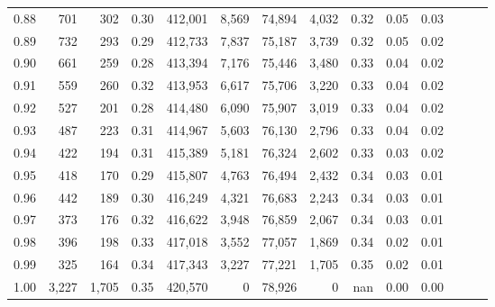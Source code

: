 \begin{tabular}{rrrrrrrrrrrrrr}
0.88 &     701 &    302 &  0.30 &  412,001 &    8,569 &  74,894 &   4,032 &  0.32 &  0.05 &      0.03 \\
0.89 &     732 &    293 &  0.29 &  412,733 &    7,837 &  75,187 &   3,739 &  0.32 &  0.05 &      0.02 \\
0.90 &     661 &    259 &  0.28 &  413,394 &    7,176 &  75,446 &   3,480 &  0.33 &  0.04 &      0.02 \\
0.91 &     559 &    260 &  0.32 &  413,953 &    6,617 &  75,706 &   3,220 &  0.33 &  0.04 &      0.02 \\
0.92 &     527 &    201 &  0.28 &  414,480 &    6,090 &  75,907 &   3,019 &  0.33 &  0.04 &      0.02 \\
0.93 &     487 &    223 &  0.31 &  414,967 &    5,603 &  76,130 &   2,796 &  0.33 &  0.04 &      0.02 \\
0.94 &     422 &    194 &  0.31 &  415,389 &    5,181 &  76,324 &   2,602 &  0.33 &  0.03 &      0.02 \\
0.95 &     418 &    170 &  0.29 &  415,807 &    4,763 &  76,494 &   2,432 &  0.34 &  0.03 &      0.01 \\
0.96 &     442 &    189 &  0.30 &  416,249 &    4,321 &  76,683 &   2,243 &  0.34 &  0.03 &      0.01 \\
0.97 &     373 &    176 &  0.32 &  416,622 &    3,948 &  76,859 &   2,067 &  0.34 &  0.03 &      0.01 \\
0.98 &     396 &    198 &  0.33 &  417,018 &    3,552 &  77,057 &   1,869 &  0.34 &  0.02 &      0.01 \\
0.99 &     325 &    164 &  0.34 &  417,343 &    3,227 &  77,221 &   1,705 &  0.35 &  0.02 &      0.01 \\
1.00 &   3,227 &  1,705 &  0.35 &  420,570 &        0 &  78,926 &       0 &   nan &  0.00 &      0.00 \\
\bottomrule
\end{tabular}
